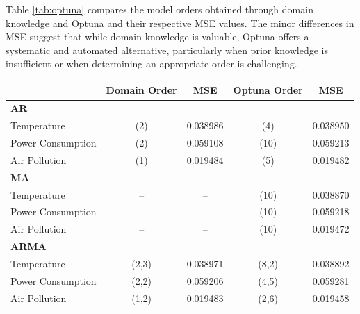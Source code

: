 \documentclass[sn-mathphys-num]{sn-jnl}
\theoremstyle{thmstyleone}%
\theoremstyle{thmstyletwo}%
\theoremstyle{thmstylethree}%
\begin{document}
Table \ref{tab:optuna} compares the model orders obtained through domain knowledge and Optuna and their respective MSE values. The minor differences in MSE suggest that while domain knowledge is valuable, Optuna offers a systematic and automated alternative, particularly when prior knowledge is insufficient or when determining an appropriate order is challenging.
\begin{table}[h]
\centering
\begin{tabular}{@{}lcccc@{}}
\toprule
\textbf{}               & \textbf{Domain Order}           & \textbf{MSE}     & \textbf{Optuna Order} & \textbf{MSE}     \\ \midrule
\textbf{AR}             &                                 &                  &                       &                  \\
Temperature             & (2)                             & 0.038986         & (4)                   & 0.038950         \\
Power Consumption       & (2)                             & 0.059108         & (10)                  & 0.059213         \\
Air Pollution           & (1)                             & 0.019484         & (5)                   & 0.019482         \\ \midrule
\textbf{MA}               &                                 &                  &                       &                  \\
Temperature             & --                              & --               & (10)                  & 0.038870         \\
Power Consumption       & --                              & --               & (10)                  & 0.059218         \\
Air Pollution           & --                              & --               & (10)                  & 0.019472         \\ \midrule
\textbf{ARMA}             &                                 &                  &                       &                  \\
Temperature             & (2,3)                           & 0.038971         & (8,2)                 & 0.038892         \\
Power Consumption       & (2,2)                           & 0.059206         & (4,5)                 & 0.059281         \\
Air Pollution           & (1,2)                           & 0.019483         & (2,6)                 & 0.019458         \\ \midrule

\end{tabular}
\end{table}
\end{document}
